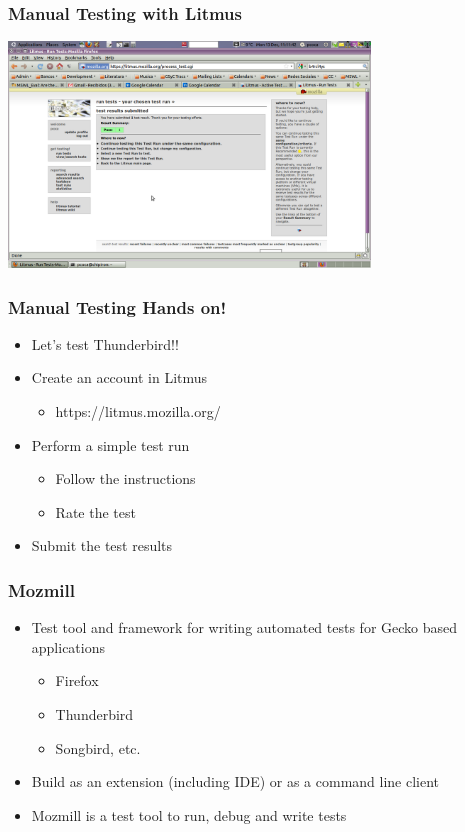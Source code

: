 \documentclass{beamer}
\begin{document}
\begin{frame}
\frametitle{Manual Testing with Litmus}
\begin{center}
 \includegraphics[height=6cm]{figs/Litmus_04_Test_Results_Submitted.png}
\begin{figure}
\end{figure}
\end{center}
\end{frame}


\begin{frame}
 \frametitle{Manual Testing Hands on!}
 \begin{itemize}
    \item Let's test Thunderbird!! 
    \item Create an account in Litmus
        \begin{itemize}
        \item https://litmus.mozilla.org/
        \end{itemize}
    \item Perform a simple test run 
        \begin{itemize}
        \item Follow the instructions
        \item Rate the test
        \end{itemize}
    \item Submit the test results
 \end{itemize}
\end{frame}



\begin{frame}
\frametitle{Mozmill}
 \begin{itemize}
  \item Test tool and framework for writing automated tests for Gecko based applications 
     \begin{itemize}
     \item Firefox
     \item Thunderbird
     \item Songbird, etc.
     \end{itemize}
  \item Build as an extension (including IDE) or as a command line client
  \item Mozmill is a test tool to run, debug and write tests
 \end{itemize}
\end{frame}
\end{document}
